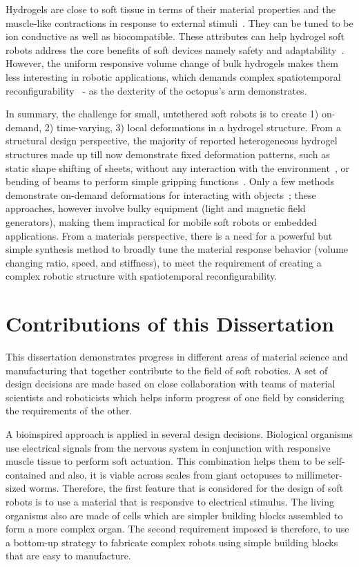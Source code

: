 Hydrogels are close to soft tissue in terms of their material properties and the muscle-like contractions in response to external stimuli~\cite{Liu2020}. They can be tuned to be ion conductive as well as biocompatible. These attributes can help hydrogel soft robots address the core benefits of soft devices namely safety and adaptability~\cite{Lee2020}. However, the uniform responsive volume change of bulk hydrogels makes them less interesting in robotic applications, which demands complex spatiotemporal reconfigurability~\cite{Erol2019} - as the dexterity of the octopus's arm demonstrates. 

In summary, the challenge for small, untethered soft robots is to create 1) on-demand, 2) time-varying, 3) local deformations in a hydrogel structure. From a structural design perspective, the majority of reported heterogeneous hydrogel structures made up till now demonstrate fixed deformation patterns, such as static shape shifting of sheets, without any interaction with the environment~\cite{SydneyGladman2016, Ma2019, Jeon2017}, or bending of beams to perform simple gripping functions~\cite{Wang2017, Ma2018, Duan2017}. Only a few methods demonstrate on-demand deformations for interacting with objects~\cite{Mourran2017, Palagi2016, Kim2018}; these approaches, however involve bulky equipment (light and magnetic field generators), making them impractical for mobile soft robots or embedded applications.
From a materials perspective, there is a need for a powerful but simple synthesis method to broadly tune the material response behavior (volume changing ratio, speed, and stiffness), to meet the requirement of creating a complex robotic structure with spatiotemporal reconfigurability.

\section{Contributions of this Dissertation}
This dissertation demonstrates progress in different areas of material science and manufacturing  that together contribute to the field of soft robotics. A set of design decisions are made based on close collaboration with teams of material scientists and roboticists which helps inform progress of one field by considering the requirements of the other. 

A bioinspired approach is applied in several design decisions. Biological organisms use electrical signals from the nervous system in conjunction with responsive muscle tissue to perform soft actuation. This combination helps them to be self-contained and also, it is viable across scales from giant octopuses to millimeter-sized worms. Therefore, the first feature that is considered for the design of soft robots is to use a material that is responsive to electrical stimulus. The living organisms also are made of cells which are simpler building blocks assembled to form a more complex organ. The second requirement imposed is therefore, to use a bottom-up strategy to fabricate complex robots using simple building blocks that are easy to manufacture. 

